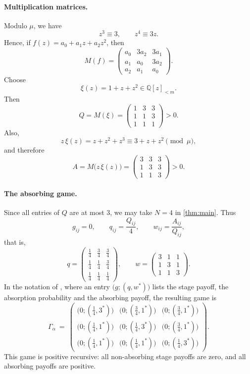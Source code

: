 \documentclass[11pt, a4paper]{article}
\theoremstyle{plain}
\theoremstyle{definition}
\newcommand{\Q}{\mathbb{Q}}
\newcommand{\PQ}{\Q[z]_{<m}}
\begin{document}
\paragraph{Multiplication matrices.}
Modulo $\mu$, we have
\[
z^3\equiv 3,
\qquad
z^4\equiv 3z .
\]
Hence, if $f(z)=a_0+a_1z+a_2z^2$, then
\[
M(f)=
\begin{pmatrix}
a_0 & 3a_2 & 3a_1\\
a_1 & a_0 & 3a_2\\
a_2 & a_1 & a_0
\end{pmatrix}.
\]
Choose
\[
\xi(z)=1+z+z^2\in\PQ .
\]
Then
\[
Q=M(\xi)=
\begin{pmatrix}
1&3&3\\
1&1&3\\
1&1&1
\end{pmatrix}>0 .
\]
Also,
\[
z\,\xi(z)=z+z^2+z^3\equiv 3+z+z^2\pmod{\mu},
\]
and therefore
\[
A=M\bigl(z\,\xi(z)\bigr)=
\begin{pmatrix}
3&3&3\\
1&3&3\\
1&1&3
\end{pmatrix}>0 .
\]

\paragraph{The absorbing game.}
Since all entries of $Q$ are at most $3$, we may take $N=4$ in \cref{thm:main}. Thus
\[
g_{ij}=0,
\qquad
q_{ij}=\frac{Q_{ij}}4,
\qquad
w_{ij}=\frac{A_{ij}}{Q_{ij}} ,
\]
that is,
\[
q=
\begin{pmatrix}
\frac14&\frac34&\frac34\\[2pt]
\frac14&\frac14&\frac34\\[2pt]
\frac14&\frac14&\frac14
\end{pmatrix},
\qquad
w=
\begin{pmatrix}
3&1&1\\[2pt]
1&3&1\\[2pt]
1&1&3
\end{pmatrix}.
\]
In the notation of \citet{OV23}, where an entry $\bigl(g;(q,w^*)\bigr)$ lists the stage payoff, the absorption probability and the absorbing payoff, the resulting game is
\[
\Gamma_{\alpha}\ =\
\begin{pmatrix}
\bigl(0;(\tfrac14,3^*)\bigr) & \bigl(0;(\tfrac34,1^*)\bigr) & \bigl(0;(\tfrac34,1^*)\bigr)\\[6pt]
\bigl(0;(\tfrac14,1^*)\bigr) & \bigl(0;(\tfrac14,3^*)\bigr) & \bigl(0;(\tfrac34,1^*)\bigr)\\[6pt]
\bigl(0;(\tfrac14,1^*)\bigr) & \bigl(0;(\tfrac14,1^*)\bigr) & \bigl(0;(\tfrac14,3^*)\bigr)
\end{pmatrix}.
\]
This game is positive recursive: all non-absorbing stage payoffs are zero, and all absorbing payoffs are positive.
\end{document}

